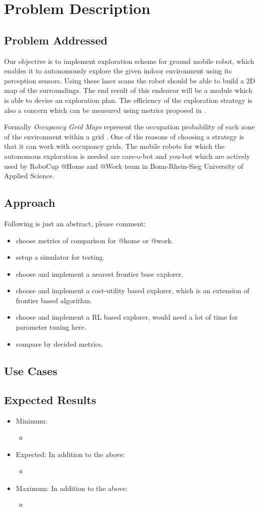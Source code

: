 \section{Problem Description}

\subsection{Problem Addressed}
Our objective is to implement exploration scheme for ground mobile robot, which enables it to
autonomously explore the given indoor environment using its perception sensors.
Using these laser scans the robot should be able to build a 2D map of the surroundings.
The end result of this endeavor will be a module which is able to devise an exploration plan.
The efficiency of the exploration strategy is also a concern which can be measured using metrics
proposed in \cite{Yan2015}.
\par
Formally \textit{Occupancy Grid Maps} represent the occupation probability of each zone of the
environment within a grid \cite{Juliae2012}. One of the reasons of choosing a strategy is that
it can work with occupancy grids. The mobile robots for which the autonomous exploration is needed
are care-o-bot and you-bot which are actively used by RoboCup @Home and @Work team in
Bonn-Rhein-Sieg University of Applied Science.

\subsection{Approach}
Following is just an abstract, please comment:
\begin{itemize}
	\item choose metrics of comparison for @home or @work.
	\item setup a simulator for testing.
	\item choose and implement a nearest frontier base explorer.
	\item choose and implement a cost-utility based explorer, which is an extension of frontier based
	algorithm.
	\item choose and implement a RL based explorer, would need a lot of time for parameter tuning here.
	\item compare by decided metrics.
\end{itemize}

\subsection{Use Cases}

\subsection{Expected Results}
\begin{itemize}
	\item Minimum:
	\begin{itemize}
		\item
	\end{itemize}
	\item Expected:
	In addition to the above:
	\begin{itemize}
		\item
	\end{itemize}
	\item Maximum:
	In addition to the above:
	\begin{itemize}
		\item
	\end{itemize}
\end{itemize}
